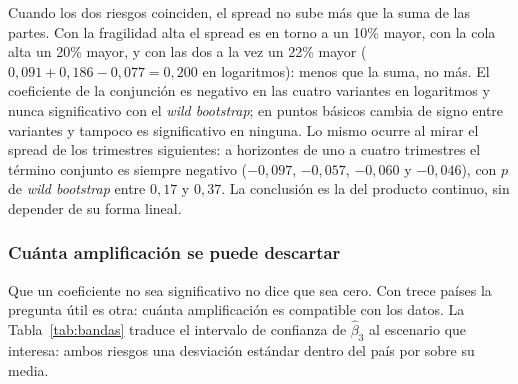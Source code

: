 Cuando los dos riesgos coinciden, el spread no sube más que la suma de las partes. Con la fragilidad alta el spread es en torno a un 10\% mayor, con la cola alta un 20\% mayor, y con las dos a la vez un 22\% mayor ($0{,}091+0{,}186-0{,}077=0{,}200$ en logaritmos): menos que la suma, no más. El coeficiente de la conjunción es negativo en las cuatro variantes en logaritmos y nunca significativo con el \textit{wild bootstrap}; en puntos básicos cambia de signo entre variantes y tampoco es significativo en ninguna. Lo mismo ocurre al mirar el spread de los trimestres siguientes: a horizontes de uno a cuatro trimestres el término conjunto es siempre negativo ($-0{,}097$, $-0{,}057$, $-0{,}060$ y $-0{,}046$), con $p$ de \textit{wild bootstrap} entre $0{,}17$ y $0{,}37$. La conclusión es la del producto continuo, sin depender de su forma lineal.

\subsubsection{Cuánta amplificación se puede descartar}
\label{sec:bandas-aditividad}

Que un coeficiente no sea significativo no dice que sea cero. Con trece países la pregunta útil es otra: cuánta amplificación es compatible con los datos. La Tabla~\ref{tab:bandas} traduce el intervalo de confianza de $\hat\beta_3$ al escenario que interesa: ambos riesgos una desviación estándar dentro del país por sobre su media.

